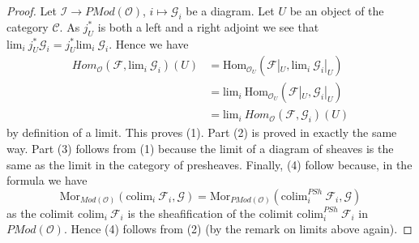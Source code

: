 \begin{proof}
Let $\mathcal{I} \to \textit{PMod}(\mathcal{O})$, $i \mapsto \mathcal{G}_i$
be a diagram. Let $U$ be an object of the category $\mathcal{C}$.
As $j_U^*$ is both a left and a right adjoint we see that
$\text{lim}_i\ j_U^*\mathcal{G}_i = j_U^* \text{lim}_i\ \mathcal{G}_i$.
Hence we have
\begin{align*}
\textit{Hom}_{\mathcal{O}}(\mathcal{F}, \text{lim}_i\ \mathcal{G}_i)(U)
& =
\text{Hom}_{\mathcal{O}_U}(\mathcal{F}|_U, \text{lim}_i\ \mathcal{G}_i|_U) \\
& =
\text{lim}_i\ \text{Hom}_{\mathcal{O}_U}(\mathcal{F}|_U, \mathcal{G}_i|_U) \\
& = \text{lim}_i\ \textit{Hom}_{\mathcal{O}}(\mathcal{F}, \mathcal{G}_i)(U)
\end{align*}
by definition of a limit. This proves (1). Part (2) is proved in exactly the
same way. Part (3) follows from (1) because the limit of a diagram of sheaves 
is the same as the limit in the category of presheaves.
Finally, (4) follow because, in the formula we have
$$
\text{Mor}_{\textit{Mod}(\mathcal{O})}(
\text{colim}_i\ \mathcal{F}_i, \mathcal{G})
=
\text{Mor}_{\textit{PMod}(\mathcal{O})}(
\text{colim}^{PSh}_i\ \mathcal{F}_i, \mathcal{G})
$$
as the colimit $\text{colim}_i\ \mathcal{F}_i$ is the sheafification of
the colimit $\text{colim}^{PSh}_i\ \mathcal{F}_i$ in
$\textit{PMod}(\mathcal{O})$. Hence (4) follows from (2)
(by the remark on limits above again).
\end{proof}

